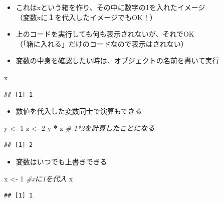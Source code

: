 \documentclass[
]{book}
\newenvironment{Shaded}{\begin{snugshade}}{\end{snugshade}}
\newcommand{\CommentTok}[1]{\textcolor[rgb]{0.56,0.35,0.01}{\textit{#1}}}
\newcommand{\DecValTok}[1]{\textcolor[rgb]{0.00,0.00,0.81}{#1}}
\newcommand{\NormalTok}[1]{#1}
\newcommand{\OtherTok}[1]{\textcolor[rgb]{0.56,0.35,0.01}{#1}}
\newcommand{\SpecialCharTok}[1]{\textcolor[rgb]{0.81,0.36,0.00}{\textbf{#1}}}
\providecommand{\tightlist}{%
  \setlength{\itemsep}{0pt}\setlength{\parskip}{0pt}}
\begin{document}
\begin{itemize}
\tightlist
\item
  これはxという箱を作り、その中に数字の1を入れたイメージ\\
  （変数xに１を代入したイメージでもOK！）
\item
  上のコードを実行しても何も表示されないが、それでOK\\
  （「箱に入れる」だけのコードなので表示はされない）
\item
  変数の中身を確認したい時は、オブジェクトの名前を書いて実行
\end{itemize}

\begin{Shaded}
\begin{Highlighting}[]
\NormalTok{x}
\end{Highlighting}
\end{Shaded}

\begin{verbatim}
## [1] 1
\end{verbatim}

\begin{itemize}
\tightlist
\item
  数値を代入した変数同士で演算もできる
\end{itemize}

\begin{Shaded}
\begin{Highlighting}[]
\NormalTok{y }\OtherTok{\textless{}{-}} \DecValTok{1} 
\NormalTok{z }\OtherTok{\textless{}{-}} \DecValTok{2}
\NormalTok{y }\SpecialCharTok{*}\NormalTok{ z }\CommentTok{\# 1*2を計算したことになる}
\end{Highlighting}
\end{Shaded}

\begin{verbatim}
## [1] 2
\end{verbatim}

\begin{itemize}
\tightlist
\item
  変数はいつでも上書きできる
\end{itemize}

\begin{Shaded}
\begin{Highlighting}[]
\NormalTok{x }\OtherTok{\textless{}{-}} \DecValTok{1} \CommentTok{\#xに1を代入}
\NormalTok{x}
\end{Highlighting}
\end{Shaded}

\begin{verbatim}
## [1] 1
\end{verbatim}
\end{document}
